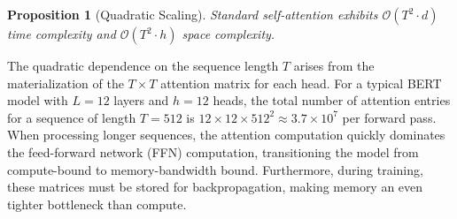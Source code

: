 \documentclass[11pt]{article}
\newtheorem{proposition}[theorem]{Proposition}
\begin{document}
\begin{proposition}[Quadratic Scaling]
Standard self-attention exhibits $\mathcal{O}(T^2 \cdot d)$ time complexity and $\mathcal{O}(T^2 \cdot h)$ space complexity.
\end{proposition}

The quadratic dependence on the sequence length $T$ arises from the materialization of the $T \times T$ attention matrix for each head. For a typical BERT model with $L=12$ layers and $h=12$ heads, the total number of attention entries for a sequence of length $T=512$ is $12 \times 12 \times 512^2 \approx 3.7 \times 10^7$ per forward pass. When processing longer sequences, the attention computation quickly dominates the feed-forward network (FFN) computation, transitioning the model from compute-bound to memory-bandwidth bound. Furthermore, during training, these matrices must be stored for backpropagation, making memory an even tighter bottleneck than compute.
\end{document}
